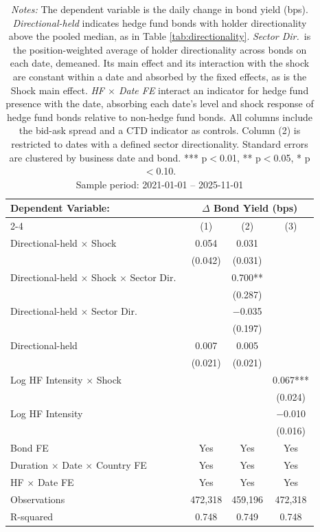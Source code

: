 \documentclass[english, 11pt, oneside]{article}
\begin{document}
\begin{table}[h!]
\centering
\caption{\textbf{Same-Date Identification of the Directionality Contrast}}
\footnotesize
\setlength{\tabcolsep}{8pt}
\renewcommand{\arraystretch}{1.1}
\begin{tabular}{l c c c}
\toprule
\textbf{Dependent Variable:} & \multicolumn{3}{c}{\textbf{$\Delta$ Bond Yield (bps)}} \\
\cmidrule(lr){2-4}
 & (1) & (2) & (3) \\
\midrule
Directional-held $\times$ Shock & 0.054 & 0.031 & \\
 & (0.042) & (0.031) & \\
Directional-held $\times$ Shock $\times$ Sector Dir.\ & & 0.700** & \\
 & & (0.287) & \\
Directional-held $\times$ Sector Dir.\ & & $-$0.035 & \\
 & & (0.197) & \\
Directional-held & 0.007 & 0.005 & \\
 & (0.021) & (0.021) & \\
Log HF Intensity $\times$ Shock & & & 0.067*** \\
 & & & (0.024) \\
Log HF Intensity & & & $-$0.010 \\
 & & & (0.016) \\
\midrule
Bond FE & Yes & Yes & Yes \\
Duration $\times$ Date $\times$ Country FE & Yes & Yes & Yes \\
HF $\times$ Date FE & Yes & Yes & Yes \\
\midrule
Observations & 472,318 & 459,196 & 472,318 \\
R-squared & 0.748 & 0.749 & 0.748 \\
\bottomrule
\end{tabular}
\label{tab:same_date}
\caption*{\textit{Notes:} The dependent variable is the daily change in bond yield (bps). \textit{Directional-held} indicates hedge fund bonds with holder directionality above the pooled median, as in Table \ref{tab:directionality}. \textit{Sector Dir.}\ is the position-weighted average of holder directionality across bonds on each date, demeaned. Its main effect and its interaction with the shock are constant within a date and absorbed by the fixed effects, as is the Shock main effect. \textit{HF $\times$ Date FE} interact an indicator for hedge fund presence with the date, absorbing each date's level and shock response of hedge fund bonds relative to non-hedge fund bonds. All columns include the bid-ask spread and a CTD indicator as controls. Column (2) is restricted to dates with a defined sector directionality. Standard errors are clustered by business date and bond. *** p$<$0.01, ** p$<$0.05, * p$<$0.10. \\ Sample period: 2021-01-01 -- 2025-11-01}
\end{table}
\end{document}

